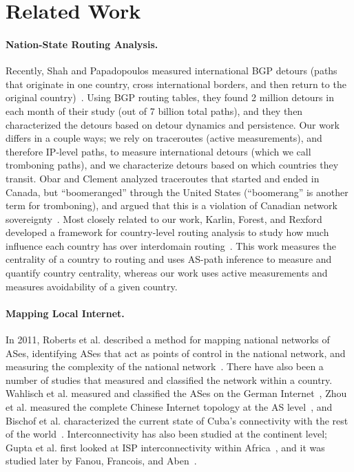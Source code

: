 \section{Related Work}
\label{related}

\paragraph{Nation-State Routing Analysis.}  Recently, Shah and Papadopoulos measured international BGP detours (paths that originate in one country, cross international borders, and then return to the original country)~\cite{shah2015characterizing}.  Using BGP routing tables, they found 2 million detours in each month of their study (out of 7 billion total paths), and they then characterized the detours based on detour dynamics and persistence.  Our work differs in a couple ways; we rely on traceroutes (active measurements), and therefore IP-level paths, to measure international detours (which we call tromboning paths), and we characterize detours based on which countries they transit.  Obar and Clement analyzed traceroutes that started and ended in Canada, but ``boomeranged'' through the United States (``boomerang'' is another term for tromboning), and argued that this is a violation of Canadian network sovereignty~\cite{obar2012internet}.  Most closely related to our work, Karlin, Forest, and Rexford developed a framework for country-level routing analysis to study how much influence each country has over interdomain routing~\cite{karlin2009nation}.  This work measures the centrality of a country to routing and uses AS-path inference to measure and quantify country centrality, whereas our work uses active measurements and measures avoidability of a given country.

\paragraph{Mapping Local Internet.}  In 2011, Roberts et al. described
a method for mapping national networks of ASes, identifying ASes that
act as points of control in the national network, and measuring the
complexity of the national network~\cite{roberts2011mapping}.  There
have also been a number of studies that measured and classified the
network within a country.  Wahlisch et al. measured and classified the
ASes on the German Internet~\cite{wahlisch2010framework,
  wahlisch2012exposing}, Zhou et al. measured the complete
Chinese Internet topology at the AS level~\cite{zhou2007chinese}, and
Bischof et al. characterized the current state of Cuba's
connectivity with the rest of the world~\cite{bischof2015and}.
Interconnectivity has also been studied at the continent level; Gupta
et al. first looked at ISP interconnectivity within
Africa~\cite{gupta2014peering}, and it was studied later by Fanou,
Francois, and Aben~\cite{fanou2015diversity}. 



